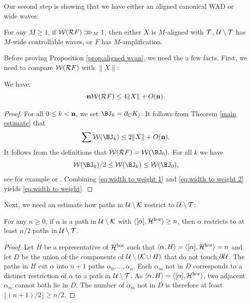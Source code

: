 \documentclass[12pt]{amsart}
\begin{document}
Our second step is  showing  that we have either an aligned canonical WAD or wide waves:
\begin{proposition}\label{prop:aligned wcan}
	For any $M\geq 1$, if $\mathcal W(\mathcal R F)\ggg_{M} 1$, then either $X$ is $M$-aligned with $\mathcal T$,  $\mathcal U\setminus \mathcal T$ has $M$-wide controllable waves, or $F$ has $M$-amplification.
\end{proposition}

Before proving Proposition \ref{prop:aligned wcan}, we need the a few facts. 
First, we need to compare $\mathcal W(\mathcal R F)$ with $\|X\|$:
\begin{lemma}\label{lem:width to weight}
	We have:
	\begin{equation}\label{eq:width to weight}
		\mathbf{n} \mathcal W(\mathcal R F)\leq 4\|X\|+ O(\mathbf{n}).
	\end{equation}
\end{lemma}

\begin{proof}
	For all $0\leq k < \mathbf{n}$, we set $\BJ_k= \dcara K_j$.
	It follows from Theorem \ref{main estimate}
	that 
	\begin{equation}\label{eq:width to weight 1}
		\sum \WW(\BJ_k)\leq 2\|X\|+O(\per).
	\end{equation}
	It follows from the definitions that $\WW(\RR F)= \WW(\BJ_0).$
	For all $k$ we have
	\begin{equation}\label{eq:width to weight 2}
		\WW(\BJ_0)/2\leq \WW(\BJ_k)\leq \WW(\BJ_0),
	\end{equation}
	see for example \cite[Theorem 9.3]{McMullen94} or \cite[(3.24)]{dudko2023mlcfeigenbaumpoints}. Combining \eqref{eq:width to weight 1} and \eqref{eq:width to weight 2} yields \eqref{eq:width to weight}.
\end{proof}


Next, we need an estimate how paths in $\mathcal U\setminus \mathcal K$ restrict to $\mathcal U\setminus \mathcal T$:
\begin{lemma}\label{lem:intersection with H}
	For any $n\geq 0$, if $\alpha$ is a path in $\mathcal U\setminus \mathcal K$ with $\langle [\alpha], \mathcal H^{\mathrm{hor}}\rangle\geq n$, then $\alpha$ restricts to  at least $n/2$  paths in $\mathcal U\setminus \mathcal T$.
\end{lemma}

\begin{proof}
	Let $H$ be a representative of $\mathcal H^{\mathrm{hor}}$ such that $\langle \alpha, H\rangle = \langle [\alpha], \mathcal H^{\mathrm{hor}}\rangle = n$ and let $D$ be the union of the components of $\mathcal U\setminus (\mathcal K\cup H)$ that do not touch $\partial \mathcal U$. The paths in $H$ cut $\alpha$ into $n+1$ paths $\alpha_0, \dots, \alpha_n$. Each $\alpha_m$ not in $D$ corresponds to a distinct restriction of $\alpha$ to a path in $\mathcal U\setminus \mathcal T$.
	As $\langle \alpha, H\rangle = \langle [\alpha], \mathcal H^{\mathrm{hor}}\rangle$, two adjacent $\alpha_m$ cannot  both lie in $D$. The number of $\alpha_m$ not in $D$ is therefore at least 
	$\lfloor (n+1)/{2}\rfloor\geq n/2.$
\end{proof}
\end{document}
